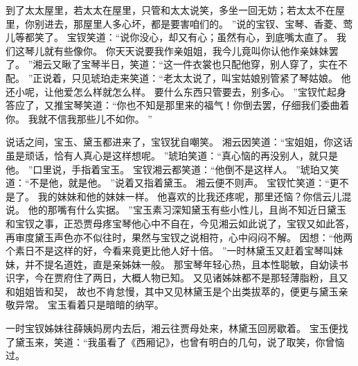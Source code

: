 到了太太屋里，若太太在屋里，只管和太太说笑，多坐一回无妨；若太太不在屋里，你别进去，那屋里人多心坏，都是要害咱们的。
”说的宝钗、宝琴、香菱、莺儿等都笑了。
宝钗笑道：“说你没心，却又有心；虽然有心，到底嘴太直了。
我们这琴儿就有些像你。
你天天说要我作亲姐姐，我今儿竟叫你认他作亲妹妹罢了。
”湘云又瞅了宝琴半日，笑道：“这一件衣裳也只配他穿，别人穿了，实在不配。
”正说着，只见琥珀走来笑道：“老太太说了，叫宝姑娘别管紧了琴姑娘。
他还小呢，让他爱怎么样就怎么样。
要什么东西只管要去，别多心。
”宝钗忙起身答应了，又推宝琴笑道：“你也不知是那里来的福气！你倒去罢，仔细我们委曲着你。
我就不信我那些儿不如你。
”\par
说话之间，宝玉、黛玉都进来了，宝钗犹自嘲笑。
湘云因笑道：“宝姐姐，你这话虽是顽话，恰有人真心是这样想呢。
”琥珀笑道：“真心恼的再没别人，就只是他。
”口里说，手指着宝玉。
宝钗湘云都笑道：“他倒不是这样人。
”琥珀又笑道：“不是他，就是他。
”说着又指着黛玉。
湘云便不则声。
宝钗忙笑道：“更不是了。
我的妹妹和他的妹妹一样。
他喜欢的比我还疼呢，那里还恼？你信云儿混说。
他的那嘴有什么实据。
”宝玉素习深知黛玉有些小性儿，且尚不知近日黛玉和宝钗之事，正恐贾母疼宝琴他心中不自在，今见湘云如此说了，宝钗又如此答，再审度黛玉声色亦不似往时，果然与宝钗之说相符，心中闷闷不解。
因想：“他两个素日不是这样的好，今看来竟更比他人好十倍。
”一时林黛玉又赶着宝琴叫妹妹，并不提名道姓，直是亲姊妹一般。
那宝琴年轻心热，且本性聪敏，自幼读书识字，今在贾府住了两日，大概人物已知。
又见诸姊妹都不是那轻薄脂粉，且又和姐姐皆和契，
故也不肯怠慢，其中又见林黛玉是个出类拔萃的，便更与黛玉亲敬异常。
宝玉看着只是暗暗的纳罕。
\par
一时宝钗姊妹往薛姨妈房内去后，湘云往贾母处来，林黛玉回房歇着。
宝玉便找了黛玉来，笑道：“我虽看了《西厢记》，也曾有明白的几句，说了取笑，你曾恼过。
